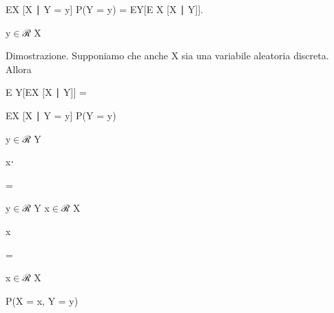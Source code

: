 \documentclass[a4paper,portrait,12pt]{article}
\begin{document}
\begin{flushleft}
EX [X ∣ Y = y] P(Y = y) = EY[E X [X ∣ Y]].
\end{flushleft}


\begin{flushleft}
y$\in$ℛ X
\end{flushleft}





\begin{flushleft}
Dimostrazione. Supponiamo che anche X sia una variabile aleatoria discreta. Allora
\end{flushleft}


\begin{flushleft}
E Y[EX [X ∣ Y]] =
\end{flushleft}





\begin{flushleft}
EX [X ∣ Y = y] P(Y = y)
\end{flushleft}


\begin{flushleft}
y$\in$ℛ Y
\end{flushleft}





\begin{flushleft}
x⋅
\end{flushleft}





=


\begin{flushleft}
y$\in$ℛ Y x$\in$ℛ X
\end{flushleft}





\begin{flushleft}
x
\end{flushleft}





=


\begin{flushleft}
x$\in$ℛ X
\end{flushleft}





\begin{flushleft}
P(X = x, Y = y)
\end{flushleft}
\end{document}
